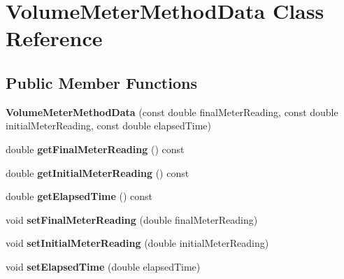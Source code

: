 \hypertarget{class_volume_meter_method_data}{}\section{Volume\+Meter\+Method\+Data Class Reference}
\label{class_volume_meter_method_data}
\subsection*{Public Member Functions}
\begin{DoxyCompactItemize}
\item 
\mbox{\label{class_volume_meter_method_data_a9bedae0d1c80b0fe40bd74e0fa1bbf2c}} 
{\bfseries Volume\+Meter\+Method\+Data} (const double final\+Meter\+Reading, const double initial\+Meter\+Reading, const double elapsed\+Time)
\item 
\mbox{\label{class_volume_meter_method_data_a6b1580eee08d323a1cb70650c519470b}} 
double {\bfseries get\+Final\+Meter\+Reading} () const
\item 
\mbox{\label{class_volume_meter_method_data_a1dce034a5b5018b3dfb888d4d8f0c69e}} 
double {\bfseries get\+Initial\+Meter\+Reading} () const
\item 
\mbox{\label{class_volume_meter_method_data_a6551ffb2db97c7158cf19ac3908e5007}} 
double {\bfseries get\+Elapsed\+Time} () const
\item 
\mbox{\label{class_volume_meter_method_data_a0502a308919b685c68bcfbaab0922a53}} 
void {\bfseries set\+Final\+Meter\+Reading} (double final\+Meter\+Reading)
\item 
\mbox{\label{class_volume_meter_method_data_a7d2aae1eba1dc115caded2cb6b7bd9a5}} 
void {\bfseries set\+Initial\+Meter\+Reading} (double initial\+Meter\+Reading)
\item 
\mbox{\label{class_volume_meter_method_data_a41cf3174466d024c8dab4a1f5705a779}} 
void {\bfseries set\+Elapsed\+Time} (double elapsed\+Time)
\item 

\end{DoxyCompactItemize}
